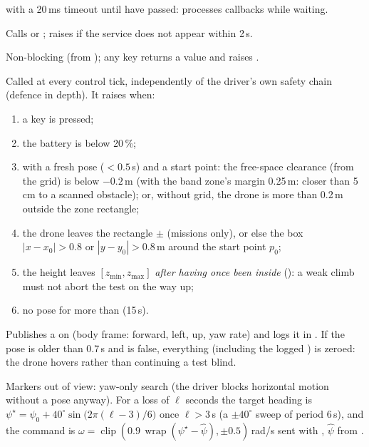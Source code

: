  with a 20\,ms timeout until  have passed: processes callbacks while waiting.

Calls  or ; raises  if the service does not appear within
2\,s.

Non-blocking  (from ); any key returns a value and raises
.

Called at every control tick, independently of the driver's own safety chain (defence in depth). It raises
 when:
\begin{enumerate}[nosep]
\item a key is pressed;
\item the battery is below 20\,\%;
\item with a fresh pose ($<0.5$\,s) and a start point: the free-space clearance (from the grid) is below
 $- 0.2$\,m (with the band zone's margin 0.25\,m: closer than 5\,cm to a scanned obstacle); or,
without grid, the drone is more than 0.2\,m outside the zone rectangle;
\item the drone leaves the  rectangle $\pm$  (missions only), or else the box
$|x - x_0| > 0.8$ or $|y - y_0| > 0.8$\,m around the start point $p_0$;
\item the height leaves $[z_{\min}, z_{\max}]$ \emph{after having once been inside} (): a weak
climb must not abort the test on the way up;
\item no pose for more than  (15\,s).
\end{enumerate}

Publishes a  on  (body frame:  forward, 
left,  up,  yaw rate) and logs it in . If the pose is older
than 0.7\,s and  is false, everything (including the logged ) is zeroed: the drone hovers
rather than continuing a test blind.

Markers out of view: yaw-only search (the driver blocks horizontal motion without a pose anyway). For a loss of
$\ell$ seconds the target heading is
$\psi^\star = \psi_0 + 40^\circ \sin\big(2\pi(\ell-3)/6\big)$ once $\ell>3$\,s (a $\pm40^\circ$ sweep of period
6\,s), and the command is $\omega = \operatorname{clip}(0.9\,\operatorname{wrap}(\psi^\star - \hat\psi), \pm 0.5)$\,rad/s
sent with , $\hat\psi$ from .

